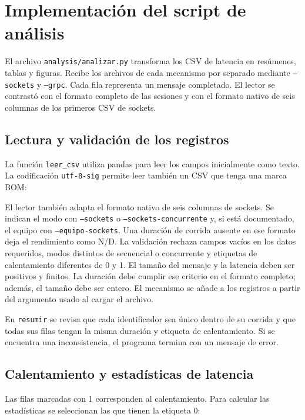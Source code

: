 \section{Implementación del script de análisis}
\label{sec:implementacion-analisis}

El archivo \texttt{analysis/analizar.py} transforma los CSV de latencia
en resúmenes, tablas y figuras. Recibe los archivos de cada mecanismo
por separado mediante \texttt{--sockets} y \texttt{--grpc}. Cada fila
representa un mensaje completado. El lector se contrastó con el formato completo de las sesiones y con
el formato nativo de seis columnas de los primeros CSV de sockets.

\subsection{Lectura y validación de los registros}
La función \texttt{leer\_csv} utiliza pandas para leer los campos
inicialmente como texto. La codificación \texttt{utf-8-sig} permite
leer también un CSV que tenga una marca BOM:



El lector también adapta el formato nativo de seis columnas de sockets.
Se indican el modo con \texttt{--sockets} o
\texttt{--sockets-concurrente} y, si está documentado, el equipo con
\texttt{--equipo-sockets}. Una duración de corrida ausente en ese formato
deja el rendimiento como N/D.
La validación rechaza campos vacíos en los datos requeridos, modos distintos de secuencial o
concurrente y etiquetas de calentamiento diferentes de 0 y 1.
El tamaño del mensaje y la latencia deben ser positivos y finitos.
La duración debe cumplir ese criterio en el formato completo; además,
el tamaño debe ser entero. El mecanismo se añade a los
registros a partir del argumento usado al cargar el archivo.

En \texttt{resumir} se revisa que cada identificador sea único dentro de
su corrida y que todas sus filas tengan la misma duración y etiqueta
de calentamiento. Si se encuentra una inconsistencia, el programa
termina con un mensaje de error.

\subsection{Calentamiento y estadísticas de latencia}
Las filas marcadas con 1 corresponden al calentamiento. Para calcular
las estadísticas se seleccionan las que tienen la etiqueta 0:

